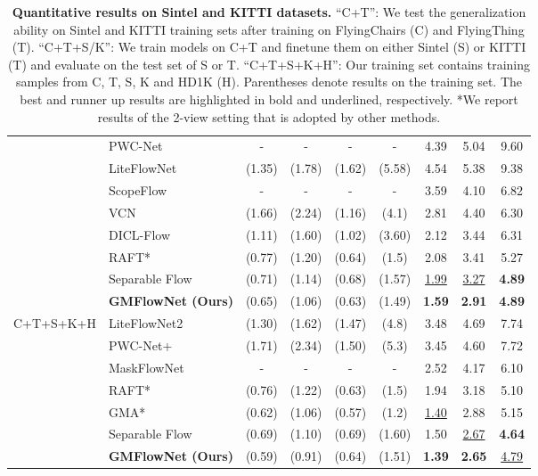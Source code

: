 \documentclass[10pt,twocolumn,letterpaper]{article}
\begin{document}
\begin{table*}[ht]
{\begin{tabular}{clccccccc}
& PWC-Net\cite{sun2018pwc}        & -  & - & - & - & 4.39 & 5.04 & 9.60 \\
                     & LiteFlowNet\cite{hui2018liteflownet} & (1.35) & (1.78) & (1.62) & (5.58) & 4.54 & 5.38 & 9.38 \\
                     & ScopeFlow\cite{bar2020scopeflow} & - & - & - & - & 3.59 & 4.10 & 6.82 \\
                     & VCN \cite{yang2019volumetric}            & (1.66)     & (2.24) & (1.16) & (4.1) & 2.81  & 4.40 & 6.30 \\
                     & DICL-Flow\cite{wang2020displacement} & (1.11) & (1.60) & (1.02) & (3.60) & 2.12 & 3.44 & 6.31 \\
& RAFT*\cite{teed2020raft} & (0.77) & (1.20) & (0.64) & (1.5) & 2.08 & 3.41 & 5.27\\
                     & Separable Flow\cite{zhang2021separable} & (0.71) & (1.14) & (0.68) & (1.57) & \underline{1.99} & \underline{3.27} & {\bf 4.89}\\
                     & {\bf GMFlowNet (Ours)} & (0.65) & (1.06) & (0.63) & (1.49) & {\bf 1.59} & {\bf 2.91} & {\bf 4.89} \\ 
                     \midrule
                     
\multirow{8}{*}{C+T+S+K+H}
                     & LiteFlowNet2 \cite{hui2020lightweight} & (1.30) & (1.62) & (1.47) & (4.8) & 3.48  & 4.69 & 7.74 \\
                     & PWC-Net+\cite{sun2019models}   & (1.71)     & (2.34)  & (1.50) & (5.3)  & 3.45  & 4.60 & 7.72 \\
                     & MaskFlowNet\cite{Zhao2020MaskFlownetAF} & - & - & - & - & 2.52 & 4.17 & 6.10 \\
                     & RAFT*\cite{teed2020raft}      & (0.76)  & (1.22) & (0.63) & (1.5) & 1.94 & 3.18 & 5.10 \\ 
& GMA* \cite{jiang2021learning} & (0.62) & (1.06) & (0.57) & (1.2) & \underline{1.40} & 2.88  & 5.15 \\
                     & Separable Flow\cite{zhang2021separable} & (0.69) & (1.10) & (0.69) & (1.60) & 1.50 & \underline{2.67}  & {\bf 4.64} \\
                     & {\bf GMFlowNet (Ours)} & (0.59) & (0.91) & (0.64) & (1.51) & {\bf 1.39} & {\bf 2.65} &
                     \underline{4.79} \\ 
                     \bottomrule
\end{tabular}
}
\caption{{\bf Quantitative results on Sintel and KITTI datasets.} 
``C+T'': We test the generalization ability on Sintel and KITTI training sets after training on FlyingChairs (C) and FlyingThing (T). 
``C+T+S/K'': We train models on C+T and finetune them on either Sintel (S) or KITTI (T) and evaluate on the test set of S or T. 
``C+T+S+K+H'': Our training set contains training samples from C, T, S, K and HD1K (H). 
Parentheses denote results on the training set. The best and runner up results are highlighted in bold and underlined, respectively.
*We report results of the 2-view setting that is adopted by other methods.}
\label{table:sota_com}
\end{table*}
\end{document}
